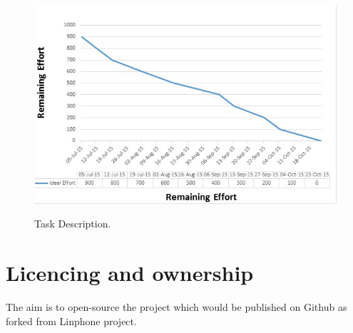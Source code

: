 \documentclass[a4paper]{article}
\begin{document}
\begin{figure}
\includegraphics[width=1\linewidth]{./pictures/burnDown.jpg}\\
\caption{\label{fig:Discription}Task Description.}
\end{figure}

\section{Licencing and ownership}
The aim is to open-source the project which would be published on Github as forked from Linphone project. 
\end{document}
